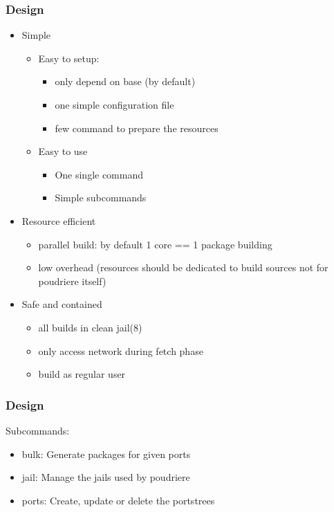 \begin{frame}
	\frametitle{Design}
	\begin{itemize}
		\item Simple
			\begin{itemize}
				\item Easy to setup:
					\begin{itemize}
						\item only depend on base (by default)
						\item one simple configuration file
						\item few command to prepare the resources
					\end{itemize}
				\item Easy to use
					\begin{itemize}
						\item One single command
						\item Simple subcommands
					\end{itemize}
			\end{itemize}
		\item Resource efficient
			\begin{itemize}
				\item parallel build: by default 1 core == 1 package building
				\item low overhead (resources should be dedicated to build sources not for poudriere itself)
			\end{itemize}
		\item Safe and contained
			\begin{itemize}
				\item all builds in clean jail(8)
				\item only access network during fetch phase
				\item build as regular user
			\end{itemize}
	\end{itemize}
\end{frame}

\begin{frame}
	\frametitle{Design}
	Subcommands:
	\begin{itemize}
		\item bulk: Generate packages for given ports
		\item jail: Manage the jails used by poudriere
		\item ports: Create, update or delete the portstrees
	\end{itemize}
\end{frame}

